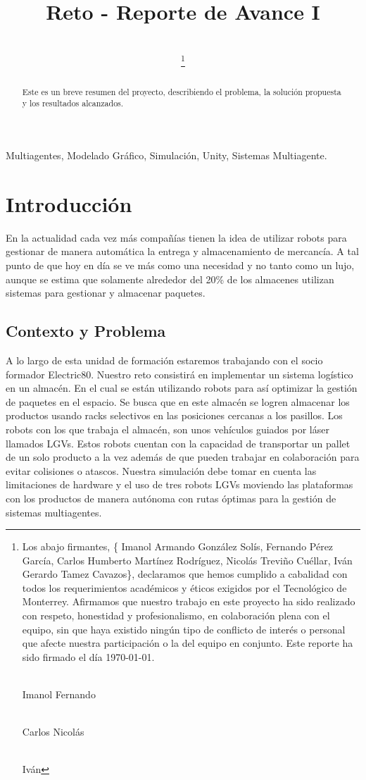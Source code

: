 \documentclass[sjournal]{IEEEtran}
\title{Reto - Reporte de Avance I}
\author{
    \IEEEauthorblockN{%
        Imanol Armando González Solís, 
        Fernando Pérez García,\\
        Carlos Humberto Martínez Rodríguez, 
        Nicolás Treviño Cuéllar, \\
        Iván Gerardo Tamez Cavazos
    }\\
    \IEEEauthorblockA{%
        Equipo II, TC2008B.302\\
        Tecnologico de Monterrey, \\
        Monterrey 64700, Mexico, \\
        E-mails: \{A00835759, A01285236, A01281715, A01178085, A00835985\}@tec.mx
    }%
\thanks{%
    Los abajo firmantes, \{        Imanol Armando González Solís, 
        Fernando Pérez García,
        Carlos Humberto Martínez Rodríguez, 
        Nicolás Treviño Cuéllar, 
        Iván Gerardo Tamez Cavazos\}, declaramos que hemos cumplido a cabalidad con todos los requerimientos académicos y éticos exigidos por el Tecnológico de Monterrey. Afirmamos que nuestro trabajo en este proyecto ha sido realizado con respeto, honestidad y profesionalismo, en colaboración plena con el equipo, sin que haya existido ningún tipo de conflicto de interés o personal que afecte nuestra participación o la del equipo en conjunto. Este reporte ha sido firmado el día \today.
  
    \vspace{0.5cm}
    
    \noindent
    \underline{\hspace{4cm}} \hfill \underline{\hspace{4cm}} \\
    Imanol \hfill Fernando

    \vspace{0.5cm}

    \noindent
    \underline{\hspace{4cm}} \hfill \underline{\hspace{4cm}} \\
    Carlos \hfill Nicolás    
    
    \vspace{0.5cm}
    
        \noindent
    \underline{\hspace{4cm}} \\
    Iván
}}
\begin{document}

\maketitle

\begin{abstract}
    Este es un breve resumen del proyecto, describiendo el problema, la solución propuesta y los resultados alcanzados.
\end{abstract}

\begin{IEEEkeywords}
Multiagentes, Modelado Gráfico, Simulación, Unity, Sistemas Multiagente.
\end{IEEEkeywords}

\section{Introducción}
En la actualidad cada vez más compañías tienen la idea de utilizar robots para gestionar de manera automática la entrega y almacenamiento de mercancía. A tal punto de que hoy en día se ve más como una necesidad y no tanto como un lujo, aunque se estima que solamente alrededor del 20\% de los almacenes utilizan sistemas para gestionar y almacenar paquetes. 


\subsection{Contexto y Problema}
A lo largo de esta unidad de formación estaremos trabajando con el socio formador Electric80. Nuestro reto consistirá en implementar un sistema logístico en un almacén. En el cual se están utilizando robots para así optimizar la gestión de paquetes en el espacio. Se busca que en este almacén se logren almacenar los productos usando racks selectivos en las posiciones cercanas a los pasillos. Los robots con los que trabaja el almacén, son unos vehículos guiados por láser llamados LGVs. Estos robots cuentan con la capacidad de transportar un pallet de un solo producto a la vez además de que pueden trabajar en colaboración para evitar colisiones o atascos. Nuestra simulación debe tomar en cuenta las limitaciones de hardware y el uso de tres robots LGVs moviendo las plataformas con los productos de manera autónoma con rutas óptimas para la gestión de sistemas multiagentes.
\end{document}
